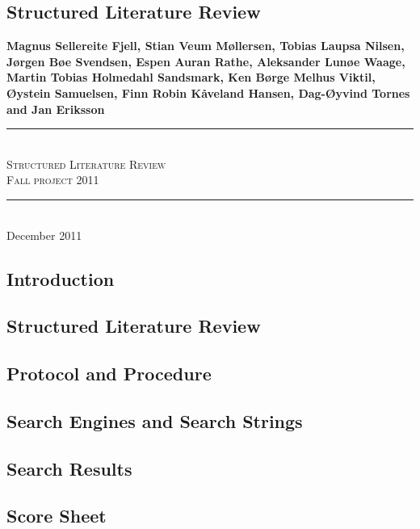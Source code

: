 \appendix
\begin{refsegment}

\chapter{Structured Literature Review}
\label{appendix:slrreport}

\newcommand{\slrTitle}{Structured Literature Review}
\newcommand{\slrSubtitle}{Fall project 2011}
\newcommand{\slrMadeby}{Magnus Sellereite Fjell, Stian Veum M{\o}llersen, Tobias Laupsa Nilsen, J{\o}rgen B{\o}e Svendsen, Espen Auran Rathe, Aleksander Lun{\o}e Waage, Martin Tobias Holmedahl Sandsmark, Ken B{\o}rge Melhus Viktil, {\O}ystein Samuelsen, Finn Robin K{\aa}veland Hansen, Dag-{\O}yvind Tornes and Jan Eriksson}
\newcommand{\slrDate}{December 2011}
\newcommand{\Hline}{\rule{\linewidth}{0.3mm} \\}

\begin{center}
\large \textbf{\slrMadeby}

\vspace{3cm}
\Hline
\Huge \textsc{\slrTitle}
\vspace{2cm}
\huge \\ \textsc{\slrSubtitle}
\Hline
\vfill
\normalsize \slrDate
\end{center}

\section{Introduction}


\section{Structured Literature Review}


\section{Protocol and Procedure}


\section{Search Engines and Search Strings}


\section{Search Results}


\section{Score Sheet}


\clearpage

\end{refsegment}

\cleardoublepage
{}
{}
\printbibliography[segment=1, title=Structured Literature Review - Bibliography]
